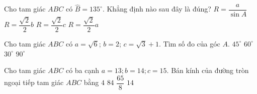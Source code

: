 \begin{ex}
	Cho tam giác $ABC$ có $\widehat{B}=135^\circ$. Khẳng định nào sau đây là đúng?
	\choice
	{$R=\dfrac{a}{\sin A}$}
	{\True $R=\dfrac{\sqrt{2}}{2}b$}
	{$R=\dfrac{\sqrt{2}}{2}c$}
	{$R=\dfrac{\sqrt{2}}{2}a$}
\end{ex}
\begin{ex}
	Cho tam giác $ABC$ có $a=\sqrt{6}$; $b=2$; $c=\sqrt{3}+1$. Tìm số đo của góc $A$.
	\choice
	{$45^{\circ}$}
	{\True $60^{\circ}$}
	{$30^{\circ}$}
	{$90^{\circ}$}
\end{ex}
\begin{ex}
	Cho tam giác $ABC$ có ba cạnh $a=13;b=14;c=15$. Bán kính của đường tròn ngoại tiếp tam giác $ABC$ bằng
	\choice
	{$4$}
	{$84$}
	{\True $\dfrac{65}{8}$}
	{$14$}
\end{ex}

